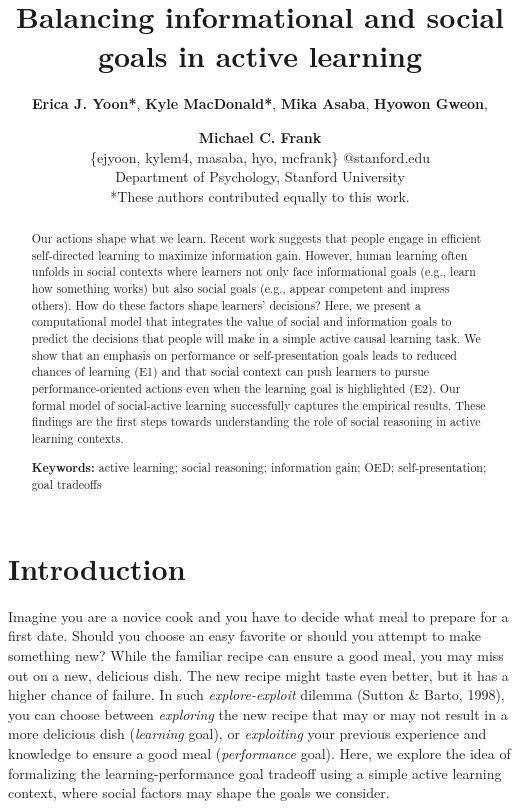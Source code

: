 \documentclass[10pt, letterpaper]{article}
\title{Balancing informational and social goals in active learning}
\author{{\large \bf Erica J. Yoon*}, {\large \bf Kyle MacDonald*}, {\large \bf Mika Asaba}, {\large \bf Hyowon Gweon}, \and {\large \bf Michael C. Frank} \\ \{ejyoon, kylem4, masaba, hyo, mcfrank\} @stanford.edu \\ Department of Psychology, Stanford University \\ *These authors contributed equally to this work.}
\begin{document}
\maketitle

\begin{abstract}
Our actions shape what we learn. Recent work suggests that people engage
in efficient self-directed learning to maximize information gain.
However, human learning often unfolds in social contexts where learners
not only face informational goals (e.g., learn how something works) but
also social goals (e.g., appear competent and impress others). How do
these factors shape learners' decisions? Here, we present a
computational model that integrates the value of social and information
goals to predict the decisions that people will make in a simple active
causal learning task. We show that an emphasis on performance or
self-presentation goals leads to reduced chances of learning (E1) and
that social context can push learners to pursue performance-oriented
actions even when the learning goal is highlighted (E2). Our formal
model of social-active learning successfully captures the empirical
results. These findings are the first steps towards understanding the
role of social reasoning in active learning contexts.

\textbf{Keywords:}
active learning; social reasoning; information gain; OED;
self-presentation; goal tradeoffs
\end{abstract}

\section{Introduction}\label{introduction}

Imagine you are a novice cook and you have to decide what meal to
prepare for a first date. Should you choose an easy favorite or should
you attempt to make something new? While the familiar recipe can ensure
a good meal, you may miss out on a new, delicious dish. The new recipe
might taste even better, but it has a higher chance of failure. In such
\emph{explore-exploit} dilemma (Sutton \& Barto, 1998), you can choose
between \emph{exploring} the new recipe that may or may not result in a
more delicious dish (\emph{learning} goal), or \emph{exploiting} your
previous experience and knowledge to ensure a good meal
(\emph{performance} goal). Here, we explore the idea of formalizing the
learning-performance goal tradeoff using a simple active learning
context, where social factors may shape the goals we consider.
\end{document}
